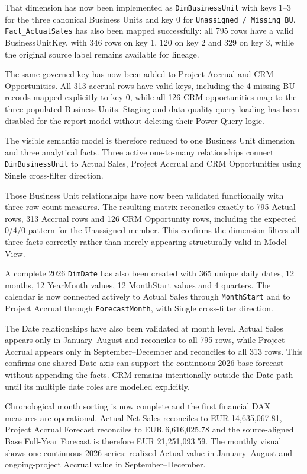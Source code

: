 \documentclass[11pt,a4paper]{article}
\begin{document}
\begin{summarybox}
That dimension has now been implemented as \texttt{DimBusinessUnit} with keys
1--3 for the three canonical Business Units and key 0 for
\texttt{Unassigned / Missing BU}. \texttt{Fact\_ActualSales} has also been
mapped successfully: all 795 rows have a valid BusinessUnitKey, with 346 rows
on key 1, 120 on key 2 and 329 on key 3, while the original source label remains
available for lineage.

The same governed key has now been added to Project Accrual and CRM
Opportunities. All 313 accrual rows have valid keys, including the 4 missing-BU
records mapped explicitly to key 0, while all 126 CRM opportunities map to the
three populated Business Units. Staging and data-quality query loading has been
disabled for the report model without deleting their Power Query logic.

The visible semantic model is therefore reduced to one Business Unit dimension
and three analytical facts. Three active one-to-many relationships connect
\texttt{DimBusinessUnit} to Actual Sales, Project Accrual and CRM Opportunities
using Single cross-filter direction.

Those Business Unit relationships have now been validated functionally with
three row-count measures. The resulting matrix reconciles exactly to
795 Actual rows, 313 Accrual rows and 126 CRM Opportunity rows, including the
expected 0/4/0 pattern for the Unassigned member. This confirms the dimension
filters all three facts correctly rather than merely appearing structurally
valid in Model View.

A complete 2026 \texttt{DimDate} has also been created with 365 unique daily
dates, 12 months, 12 YearMonth values, 12 MonthStart values and 4 quarters.
The calendar is now connected actively to Actual Sales through
\texttt{MonthStart} and to Project Accrual through \texttt{ForecastMonth}, with
Single cross-filter direction.

The Date relationships have also been validated at month level. Actual Sales
appears only in January--August and reconciles to all 795 rows, while Project
Accrual appears only in September--December and reconciles to all 313 rows.
This confirms one shared Date axis can support the continuous 2026 base forecast
without appending the facts. CRM remains intentionally outside the Date path
until its multiple date roles are modelled explicitly.

Chronological month sorting is now complete and the first financial DAX
measures are operational. Actual Net Sales reconciles to EUR 14,635,067.81,
Project Accrual Forecast reconciles to EUR 6,616,025.78 and the source-aligned
Base Full-Year Forecast is therefore EUR 21,251,093.59. The monthly visual shows
one continuous 2026 series: realized Actual value in January--August and
ongoing-project Accrual value in September--December.


\end{summarybox}
\end{document}
